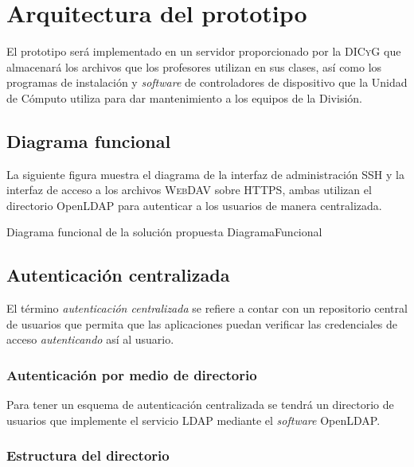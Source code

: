 \newpage
    \section {Arquitectura del prototipo}

El prototipo ser\'{a} implementado en un servidor proporcionado por la \textsc{DICyG} que almacenar\'{a} los archivos que los profesores utilizan en sus clases, as\'{i} como los programas de instalaci\'{o}n y \emph{\gls{software}} de controladores de dispositivo que la Unidad de C\'{o}mputo utiliza para dar mantenimiento a los equipos de la Divisi\'{o}n.

      \subsection {Diagrama funcional}

La siguiente figura muestra el diagrama de la interfaz de administraci\'{o}n \textsc{\gls{SSH}} y la interfaz de acceso a los archivos \textsc{\gls{WebDAV}} sobre \textsc{\gls{HTTPS}}, ambas utilizan el directorio \textup{OpenLDAP} para autenticar a los usuarios de manera centralizada.

\diagramblock
{Diagrama funcional de la soluci\'{o}n propuesta}
{DiagramaFuncional}
{
 {
  
 }
}

      \subsection {Autenticaci\'{o}n centralizada}

El t\'{e}rmino \textit{autenticaci\'{o}n centralizada} se refiere a contar con un repositorio central de usuarios que permita que las aplicaciones puedan verificar las credenciales de acceso \textit{autenticando} as\'{i} al usuario.

        \subsubsection {Autenticaci\'{o}n por medio de directorio}

Para tener un esquema de autenticaci\'{o}n centralizada se tendr\'{a} un directorio de usuarios que implemente el servicio \textsc{\gls{LDAP}} mediante el \emph{\gls{software}} \textup{OpenLDAP}.

        \subsubsection {Estructura del directorio}

